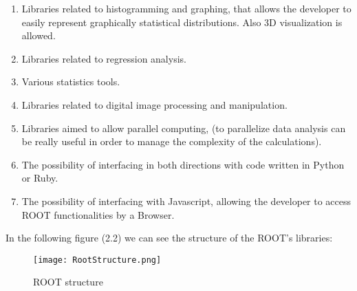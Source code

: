 \begin{enumerate}

\item Libraries related to histogramming and graphing, that allows the developer to easily represent graphically statistical distributions. Also 3D visualization is allowed.

\item Libraries related to regression analysis.

\item Various statistics tools. 

\item Libraries related to digital image processing and manipulation.

\item Libraries aimed to allow parallel computing, (to parallelize data analysis can be really useful in order to manage the complexity of the calculations).

\item The possibility of interfacing in both directions with code written in Python or Ruby.

\item The possibility of interfacing with Javascript, allowing the developer to access ROOT functionalities by a Browser.

\end{enumerate}

In the following figure (2.2) we can see the structure of the ROOT's libraries:

\begin{figure}[H]
\centering
\texttt{[image: RootStructure.png]} 
\caption{ROOT structure}
\end{figure}


